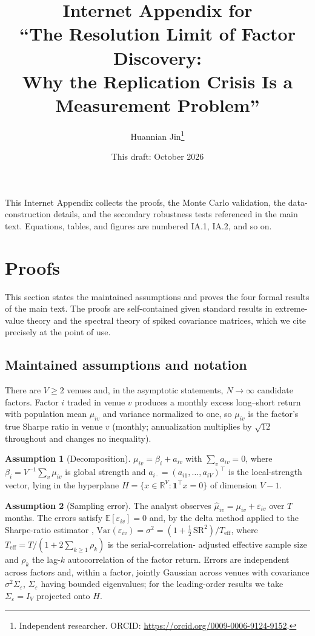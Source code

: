 \documentclass[12pt]{article}
\title{\textbf{Internet Appendix for\\
``The Resolution Limit of Factor Discovery:\\
Why the Replication Crisis Is a Measurement Problem''}}
\author{Huannian Jin\thanks{Independent researcher. ORCID:
\url{https://orcid.org/0009-0006-9124-9152}.}}
\date{This draft: October 2026}
\theoremstyle{plain}
\theoremstyle{definition}
\newtheorem{assumption}{Assumption}
\newcommand{\E}{\mathbb{E}}
\newcommand{\Var}{\mathrm{Var}}
\begin{document}
\maketitle
\noindent This Internet Appendix collects the proofs, the Monte Carlo validation,
the data-construction details, and the secondary robustness tests referenced in
the main text. Equations, tables, and figures are numbered IA.1, IA.2, and so on.

\tableofcontents
\clearpage

\section{Proofs}
\label{ia:proofs}

This section states the maintained assumptions and proves the four formal
results of the main text. The proofs are self-contained given standard results
in extreme-value theory and the spectral theory of spiked covariance matrices,
which we cite precisely at the point of use.

\subsection*{Maintained assumptions and notation}

There are $V\ge 2$ venues and, in the asymptotic statements, $N\to\infty$
candidate factors. Factor $i$ traded in venue $v$ produces a monthly excess
long--short return with population mean $\mu_{iv}$ and variance normalized to
one, so $\mu_{iv}$ is the factor's true Sharpe ratio in venue $v$ (monthly;
annualization multiplies by $\sqrt{12}$ throughout and changes no inequality).

\begin{assumption}[Decomposition]
\label{as:decomp}
$\mu_{iv}=\beta_i+a_{iv}$ with $\sum_{v}a_{iv}=0$, where $\beta_i=V^{-1}\sum_v
\mu_{iv}$ is global strength and $a_{i\cdot}=(a_{i1},\dots,a_{iV})^\top$ is the
local-strength vector, lying in the hyperplane $H=\{x\in\mathbb{R}^V:
\mathbf 1^\top x=0\}$ of dimension $V-1$.
\end{assumption}

\begin{assumption}[Sampling error]
\label{as:noise}
The analyst observes $\hat\mu_{iv}=\mu_{iv}+\varepsilon_{iv}$ over $T$ months.
The errors satisfy $\E[\varepsilon_{iv}]=0$ and, by the delta method applied to
the Sharpe-ratio estimator \citep{Lo2002},
$\Var(\varepsilon_{iv})=\sigma^2=(1+\tfrac12\,\mathrm{SR}^2)/T_{\text{eff}}$,
where $T_{\text{eff}}=T/(1+2\sum_{k\ge1}\rho_k)$ is the serial-correlation-
adjusted effective sample size and $\rho_k$ the lag-$k$ autocorrelation of the
factor return. Errors are independent across factors and, within a factor,
jointly Gaussian across venues with covariance $\sigma^2\Sigma_\varepsilon$,
$\Sigma_\varepsilon$ having bounded eigenvalues; for the leading-order results we
take $\Sigma_\varepsilon=I_V$ projected onto $H$.
\end{assumption}
\end{document}
